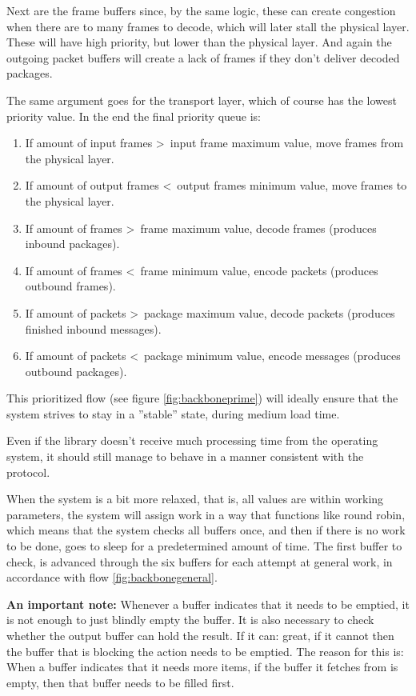 Next are the frame buffers since, by the same logic, these can create congestion when there are to many frames to decode, which will later stall the physical layer. These will have high priority, but lower than the physical layer.
And again the outgoing packet buffers will create a lack of frames if they don't deliver decoded packages.

The same argument goes for the transport layer, which of course has the lowest priority value.
 In the end the final priority queue is:

\begin{enumerate}
\item If amount of input frames \textgreater\, input frame maximum value, move frames from the physical layer.
\item If amount of output frames \textless\, output frames minimum value, move frames to the physical layer.
\item If amount of frames \textgreater\, frame maximum value, decode frames (produces inbound packages).
\item If amount of frames \textless\, frame minimum value, encode packets (produces outbound frames).
\item If amount of packets \textgreater\, package maximum value, decode packets (produces finished inbound messages).
\item If amount of packets \textless\, package minimum value, encode messages (produces outbound packages).
\end{enumerate}


This prioritized flow (see figure \ref{fig:backboneprime}) will ideally ensure that the system strives to stay in a ''stable'' state, during medium load time. 


Even if the library doesn't receive much processing time from the operating system, it should still manage to behave in a manner consistent with the protocol.


When the system is a bit more relaxed, that is, all values are within working parameters, the system will assign work in a way that functions like round robin, which means that the system checks all buffers once, and then if there is no work to be done, goes to sleep for a predetermined amount of time. The first buffer to check, is advanced through the six buffers for each attempt at general work, in accordance with flow \ref{fig:backbonegeneral}.




\textbf{An important note:}
Whenever a buffer indicates that it needs to be emptied, it is not enough to just blindly empty the buffer. It is also necessary to check whether the output buffer can hold the result. If it can: great, if it cannot then the buffer that is blocking the action needs to be emptied.
The reason for this is: When a buffer indicates that it needs more items, if the buffer it fetches from is empty, then that buffer needs to be filled first.


